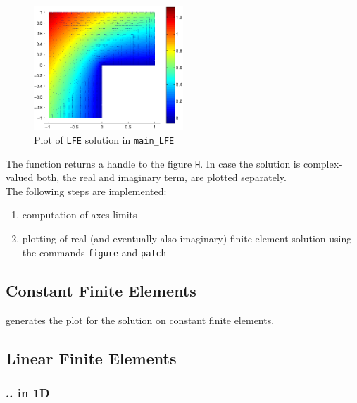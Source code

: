 \begin{figure}[htb]
  \centering
  \includegraphics[width=0.5\textwidth]{main_LFE_fig1.eps}
  \caption{Plot of {\tt LFE} solution in {\tt main\_LFE}}
  \label{fig:plot_sol}
\end{figure}

 The function returns a handle to the figure {\tt H}. In case the solution is complex-valued both, the real and imaginary term, are plotted separately. \\

 The following steps are implemented:
\begin{enumerate}
	\item computation of axes limits
	\item plotting of real (and eventually also imaginary) finite element solution using the \MATLAB commands {\tt figure} and {\tt patch}
\end{enumerate}



\subsection{Constant Finite Elements} 

  generates the plot for the solution on constant finite elements.



\subsection{Linear Finite Elements} 

\subsubsection{.. in 1D}

